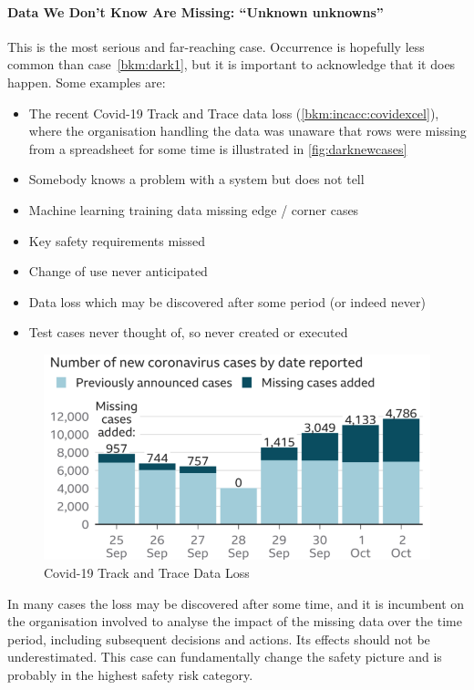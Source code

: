 \paragraph{Data We Don’t Know Are Missing: ``Unknown unknowns''}\label{bkm:dark2}
This is the most serious and far-reaching case. Occurrence is hopefully less common than case~\ref{bkm:dark1}, but it is important to acknowledge that it does happen. Some examples are:
\begin{itemize}
  \item The recent Covid-19 Track and Trace data loss (\autoref{bkm:incacc:covidexcel}), where the organisation handling the data was unaware that rows were missing from a spreadsheet for some time is illustrated in \autoref {fig:darknewcases}
  \item Somebody knows a problem with a system but does not tell
  \item Machine learning training data missing edge / corner cases
  \item Key safety requirements missed
  \item Change of use never anticipated
  \item Data loss which may be discovered after some period (or indeed never) 
  \item Test cases never thought of, so never created or executed
\end{itemize}

\begin{figure}[htbp]
  \centering
  \includegraphics[width=\textwidth/2]{images/darknewcases}
  \caption{Covid-19 Track and Trace Data Loss}
  \label{fig:darknewcases}
\end{figure}

In many cases the loss may be discovered after some time, and it is incumbent on the organisation involved to analyse the impact of the missing data over the time period, including subsequent decisions and actions. Its effects should not be underestimated. This case can fundamentally change the safety picture and is probably in the highest safety risk category.

